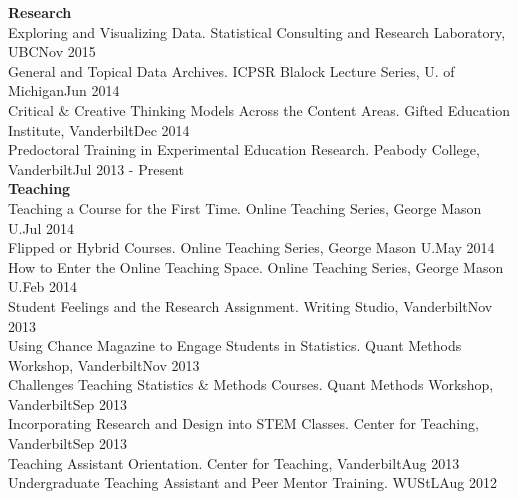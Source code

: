 {\large \textbf{Research}}\\
Exploring and Visualizing Data. Statistical Consulting and Research Laboratory, UBC\hfill{Nov 2015}\smallskip\\
General and Topical Data Archives. ICPSR Blalock Lecture Series, U. of Michigan\hfill{Jun 2014}\smallskip\\
Critical $\&$ Creative Thinking Models Across the Content Areas. Gifted Education Institute, Vanderbilt\hfill{Dec 2014}\smallskip\\
Predoctoral Training in Experimental Education Research. Peabody College, Vanderbilt\hfill{Jul 2013 - Present}\smallskip\\
{\large {\bf Teaching}}\\
Teaching a Course for the First Time. Online Teaching Series, George Mason U.\hfill{Jul 2014}\smallskip\\
Flipped or Hybrid Courses. Online Teaching Series, George Mason U.\hfill{May 2014}\smallskip\\
How to Enter the Online Teaching Space. Online Teaching Series, George Mason U.\hfill{Feb 2014}\smallskip\\
Student Feelings and the Research Assignment. Writing Studio, Vanderbilt\hfill{Nov 2013}\smallskip\\
Using Chance Magazine to Engage Students in Statistics. Quant Methods Workshop, Vanderbilt\hfill{Nov 2013}\smallskip\\
Challenges Teaching Statistics \& Methods Courses. Quant Methods Workshop, Vanderbilt\hfill{Sep 2013}\smallskip\\
Incorporating Research and Design into STEM Classes. Center for Teaching, Vanderbilt\hfill{Sep 2013}\smallskip\\
Teaching Assistant Orientation. Center for Teaching, Vanderbilt\hfill{Aug 2013}\smallskip\\
Undergraduate Teaching Assistant and Peer Mentor Training. WUStL\hfill{Aug 2012}